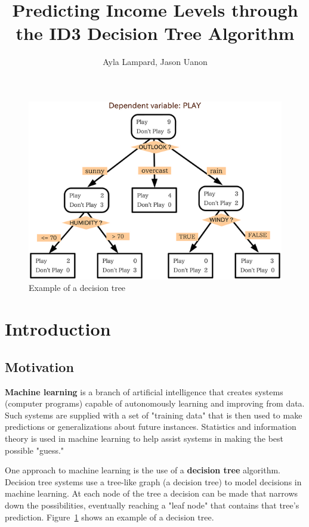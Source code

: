 \documentclass{article}
\title{Predicting Income Levels through the ID3 Decision Tree Algorithm}
\author{Ayla Lampard, Jason Uanon}
\begin{document}
\maketitle

\begin{figure}
    \centering
    \includegraphics[width=\textwidth]{figs/decision_tree.png}
    \caption{Example of a decision tree}
    \label{decision_tree}
\end{figure}

\section{Introduction}



\subsection{Motivation}

\textbf{Machine learning} is a branch of artificial intelligence that creates systems (computer programs) capable of autonomously learning and improving from data. Such systems are supplied with a set of "training data" that is then used to make predictions or generalizations about future instances. Statistics and information theory is used in machine learning to help assist systems in making the best possible "guess."

One approach to machine learning is the use of a \textbf{decision tree} algorithm. Decision tree systems use a tree-like graph (a decision tree) to model decisions in machine learning. At each node of the tree a decision can be made that narrows down the possibilities, eventually reaching a "leaf node" that contains that tree's prediction. Figure~\ref{decision_tree} shows an example of a decision tree.
\end{document}
